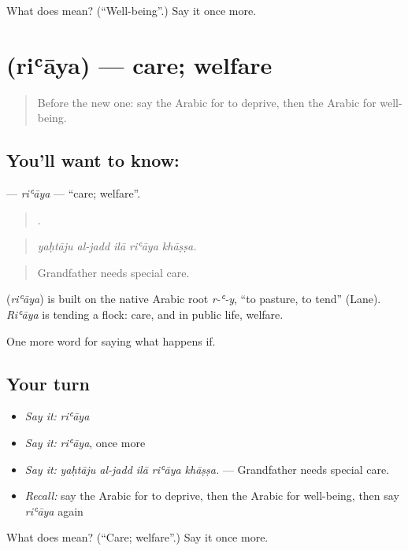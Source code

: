 \begin{tcolorbox}[breakable,colback=teal!4,colframe=teal!35!black,title={Before you move on}]
What does  mean? (\textquotedblleft{}Well-being\textquotedblright{}.) Say it once more.
\end{tcolorbox}
\section[\texorpdfstring{\ar{رعاية} (riʿāya)}{رعاية (riʿāya)}]{ (riʿāya) — care; welfare}

\label{lesson:AR-C408-riaya}



\begin{quote}
Before the new one: say the Arabic for to deprive, then the Arabic for well-being.
\end{quote}

\subsection*{You'll want to know: }
\textbf{} — \emph{riʿāya} — \textquotedblleft{}care; welfare\textquotedblright{}.

\begin{quote}
    .
\end{quote}

\begin{quote}
\emph{yaḥtāju al-jadd ilā riʿāya khāṣṣa.}
\end{quote}

\begin{quote}
Grandfather needs special care.
\end{quote}

\begin{cousinweb}
\textbf{} (\emph{riʿāya}) is built on the native Arabic root \emph{r-ʿ-y}, \textquotedblleft{}to pasture, to tend\textquotedblright{} (Lane). \emph{Riʿāya} is tending a flock: care, and in public life, welfare.
\end{cousinweb}

\begin{grammarlens}[title={What you've built}]
One more word for saying what happens if.
\end{grammarlens}

\subsection*{Your turn}
\begin{itemize}
\raggedright
  \item \emph{Say it:} \emph{riʿāya}
  \item \emph{Say it:} \emph{riʿāya}, once more
  \item \emph{Say it:} \emph{yaḥtāju al-jadd ilā riʿāya khāṣṣa.} — Grandfather needs special care.
  \item \emph{Recall:} say the Arabic for to deprive, then the Arabic for well-being, then say \emph{riʿāya} again
\end{itemize}

\begin{tcolorbox}[breakable,colback=teal!4,colframe=teal!35!black,title={Before you move on}]
What does  mean? (\textquotedblleft{}Care; welfare\textquotedblright{}.) Say it once more.
\end{tcolorbox}
